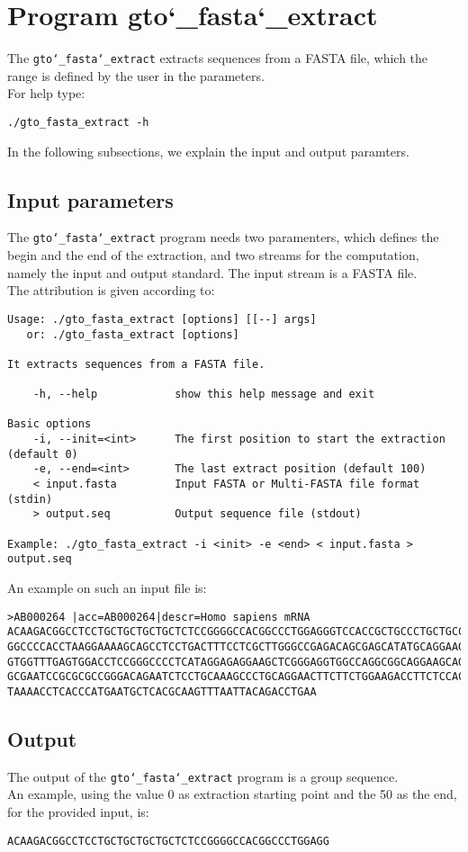 \section{Program gto\char`_fasta\char`_extract}
The \texttt{gto\char`_fasta\char`_extract} extracts sequences from a FASTA file, which the range is defined by the user in the parameters.\\
For help type:
\begin{lstlisting}
./gto_fasta_extract -h
\end{lstlisting}
In the following subsections, we explain the input and output paramters.

\subsection*{Input parameters}

The \texttt{gto\char`_fasta\char`_extract} program needs two paramenters, which defines the begin and the end of the extraction, and two streams for the computation, namely the input and output standard. The input stream is a FASTA file.\\
The attribution is given according to:
\begin{lstlisting}
Usage: ./gto_fasta_extract [options] [[--] args]
   or: ./gto_fasta_extract [options]

It extracts sequences from a FASTA file.

    -h, --help            show this help message and exit

Basic options
    -i, --init=<int>      The first position to start the extraction (default 0)
    -e, --end=<int>       The last extract position (default 100)
    < input.fasta         Input FASTA or Multi-FASTA file format (stdin)
    > output.seq          Output sequence file (stdout)

Example: ./gto_fasta_extract -i <init> -e <end> < input.fasta > output.seq
\end{lstlisting}
An example on such an input file is:
\begin{lstlisting}
>AB000264 |acc=AB000264|descr=Homo sapiens mRNA 
ACAAGACGGCCTCCTGCTGCTGCTGCTCTCCGGGGCCACGGCCCTGGAGGGTCCACCGCTGCCCTGCTGCCATTGTCCCC
GGCCCCACCTAAGGAAAAGCAGCCTCCTGACTTTCCTCGCTTGGGCCGAGACAGCGAGCATATGCAGGAAGCGGCAGGAA
GTGGTTTGAGTGGACCTCCGGGCCCCTCATAGGAGAGGAAGCTCGGGAGGTGGCCAGGCGGCAGGAAGCAGGCCAGTGCC
GCGAATCCGCGCGCCGGGACAGAATCTCCTGCAAAGCCCTGCAGGAACTTCTTCTGGAAGACCTTCTCCACCCCCCCAGC
TAAAACCTCACCCATGAATGCTCACGCAAGTTTAATTACAGACCTGAA
\end{lstlisting}

\subsection*{Output}
The output of the \texttt{gto\char`_fasta\char`_extract} program is a group sequence.\\
An example, using the value 0 as extraction starting point and the 50 as the end, for the provided input, is:
\begin{lstlisting}
ACAAGACGGCCTCCTGCTGCTGCTGCTCTCCGGGGCCACGGCCCTGGAGG
\end{lstlisting}